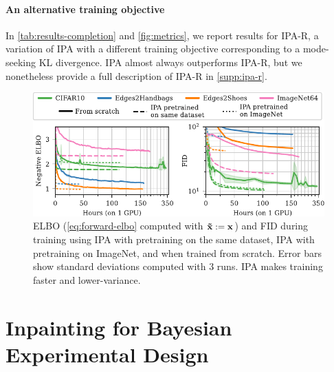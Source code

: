 \paragraph{An alternative training objective}
In \cref{tab:results-completion} and \cref{fig:metrics}, we report results for
IPA-R, a variation of IPA with a different training objective corresponding to a
mode-seeking KL divergence. IPA almost always outperforms IPA-R, but we
nonetheless provide a full description of IPA-R in \cref{supp:ipa-r}.

\begin{figure}[t]
  \vspace{-.1cm}
  \centering
  \includegraphics[scale=1]{figs/cigcvae/training-both}
  \caption{ELBO (\cref{eq:forward-elbo} computed with $\mathbf{\tilde{x}}{} := \mathbf{x}{}$) and
    FID during training using IPA with pretraining on the same dataset, IPA with
    pretraining on ImageNet, and when trained from scratch. Error bars show
    standard deviations computed with 3 runs. IPA makes training faster and
    lower-variance.}
  \label{fig:training}
  \vspace{-.3cm}
\end{figure}




\section{Inpainting for Bayesian Experimental Design} \label{sec:cigcvae-boed}

